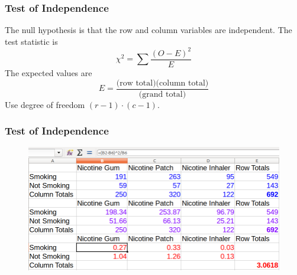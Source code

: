 \documentclass[xcolor=dvipsnames]{beamer}
\begin{document}
\begin{frame}
  \frametitle{Test of Independence}
  The null hypothesis is that the row and column variables are
  independent. The test statistic is
  \begin{equation}
    \label{eq:eikaecee}
    \chi^{2}=\sum\frac{(O-E)^{2}}{E}
  \end{equation}
  The expected values are
  \begin{equation}
    \label{eq:anairieb}
    E=\frac{\mbox{(row total)(column total)}}{\mbox{(grand total)}}
  \end{equation}
Use degree of freedom $(r-1)\cdot{}(c-1)$.
\end{frame}

\begin{frame}
  \frametitle{Test of Independence}
  \begin{figure}[h]
    \includegraphics[scale=0.35]{./diagrams/conttable.png}
  \end{figure}
\end{frame}
\end{document}
